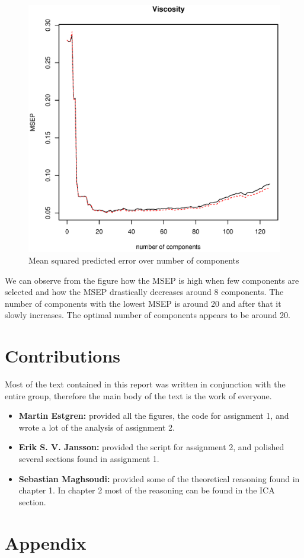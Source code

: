 \documentclass[a4paper,12pt]{article}
\begin{document}
        \begin{figure}[H]
            \centering
            \caption{Mean squared predicted error over number of components}
            \label{fig:viscosity}
            \includegraphics[width=\textwidth]{share/A2_viscosity.eps}
        \end{figure}

	We can observe from the figure how the MSEP is high when few components are selected and how the MSEP drastically decreases around 8 components. The number of components with the lowest MSEP is around 20 and after that it slowly increases. The optimal number of components appears to be around 20. 
	
    \section*{Contributions}
        Most of the text contained in this report was written in conjunction with the entire group, therefore the main body of the text is the work of everyone.
    \begin{itemize}
        \item{\textbf{Martin Estgren:} provided all the figures, the code for assignment 1, and wrote a lot of the analysis of assignment 2.}
        \item{\textbf{Erik S. V. Jansson:} provided the script for assignment 2, and polished several sections found in assignment 1.}
        \item{\textbf{Sebastian Maghsoudi:} provided some of the theoretical reasoning found in chapter 1. In chapter 2 most of the reasoning can be found in the ICA section.}
    \end{itemize}
    \nocite{*} %
    
    
    \onecolumn \appendix
    \section*{Appendix}

    
    
\end{document}
